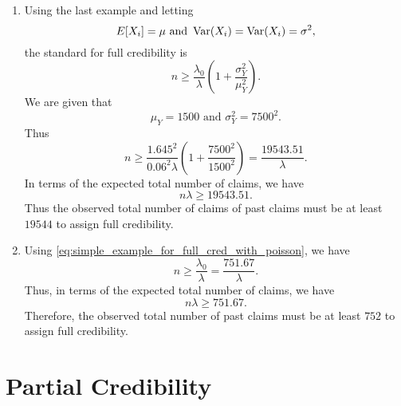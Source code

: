 \documentclass[notoc,notitlepage]{tufte-book}
\begin{document}
\begin{solution}
  \begin{enumerate}
    \item Using the last example and letting
      \begin{equation*}
        E[X_i] = \mu   \text{ and } \operatorname{Var}(X_i) = \operatorname{Var}(X_i) = \sigma^2,
      \end{equation*}
      the standard for full credibility is
      \begin{equation*}
        n \geq \frac{\lambda_0}{\lambda} \left( 1 +
        \frac{\sigma^2_Y}{\mu^2_Y} \right).
      \end{equation*}
      We are given that
      \begin{equation*}
        \mu_Y = 1500 \text{ and } \sigma^2_Y = 7500^2.
      \end{equation*}
      Thus
      \begin{equation*}
        n \geq \frac{1.645^2}{0.06^2 \lambda} \left( 1 + \frac{7500^2}{1500^2}
        \right) = \frac{19543.51}{\lambda}.
      \end{equation*}
      In terms of the expected total number of claims, we have
      \begin{equation*}
        n\lambda \geq 19543.51.
      \end{equation*}
      Thus the observed total number of claims of past claims must be at least
      $19544$ to assign full credibility.

    \item Using \cref{eq:simple_example_for_full_cred_with_poisson}, we have
      \begin{equation*}
        n \geq \frac{\lambda_0}{\lambda} = \frac{751.67}{\lambda}.
      \end{equation*}
      Thus, in terms of the expected total number of claims, we have
      \begin{equation*}
        n\lambda \geq 751.67.
      \end{equation*}
      Therefore, the observed total number of past claims must be at least $752$ 
      to assign full credibility.
  \end{enumerate}
\end{solution}


\section{Partial Credibility}%
\label{sec:partial_credibility}
\end{document}
